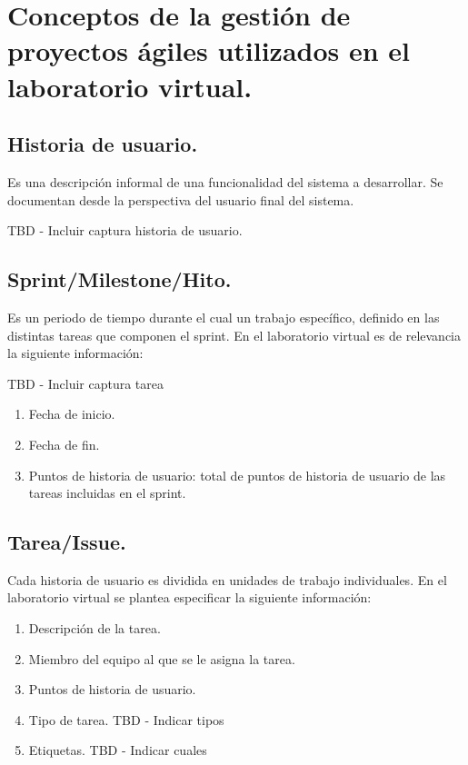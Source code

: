 
\section{Conceptos de la gestión de proyectos ágiles utilizados en el laboratorio virtual.}

\subsection{Historia de usuario.}

Es una descripción informal de una funcionalidad del sistema a desarrollar. Se documentan desde la perspectiva del usuario final del sistema.

TBD - Incluir captura historia de usuario.

\subsection{Sprint/Milestone/Hito.}

Es un periodo de tiempo durante el cual un trabajo específico, definido en las distintas tareas que componen el sprint. En el laboratorio virtual es de relevancia la siguiente información:

TBD - Incluir captura tarea

\begin{enumerate}
	\item Fecha de inicio.
	\item Fecha de fin.
	\item Puntos de historia de usuario: total de puntos de historia de usuario de las tareas incluidas en el sprint.	
\end{enumerate}

\subsection{Tarea/Issue.}

Cada historia de usuario es dividida en unidades de trabajo individuales. En el laboratorio virtual se plantea especificar la siguiente información:

\begin{enumerate}
	\item Descripción de la tarea.
	\item Miembro del equipo al que se le asigna la tarea.
	\item Puntos de historia de usuario.
	\item Tipo de tarea. TBD - Indicar tipos
	\item Etiquetas. TBD - Indicar cuales	
\end{enumerate}

